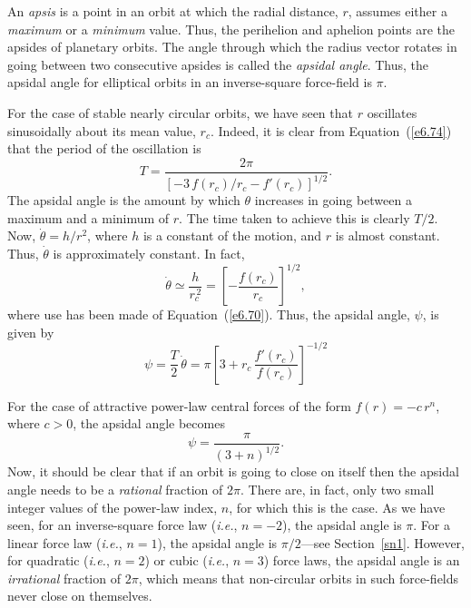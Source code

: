 An {\em apsis}\/ is a point in an orbit at which the radial distance, $r$, assumes either a
{\em maximum}\/  or a {\em minimum}\/ value. Thus, the perihelion and aphelion points
are the apsides of planetary orbits. The angle through which the radius vector
rotates in going between two consecutive apsides is called the {\em apsidal
angle}. Thus, the apsidal angle for elliptical orbits in an inverse-square
force-field is $\pi$. 

For the case of stable nearly circular orbits, we have seen that $r$ oscillates sinusoidally 
about its mean value, $r_c$. Indeed, it is clear from Equation~(\ref{e6.74}) that
the period of the oscillation is
\begin{equation}
T = \frac{2\pi}{\left[-3\,f(r_c)/r_c - f'(r_c)\right]^{1/2}}.
\end{equation}
The apsidal angle is the amount by which $\theta$ increases in going
between a maximum and a minimum of $r$. The time taken
to achieve this is clearly $T/2$.  Now, $\dot{\theta} = h/r^2$, where $h$
is a constant of the motion, and $r$ is almost constant. Thus, $\dot{\theta}$
is approximately constant. In fact,
\begin{equation}
\dot{\theta} \simeq \frac{h}{r_c^{\,2}} = \left[-\frac{f(r_c)}{r_c}\right]^{1/2},
\end{equation}
where use has been made of Equation~(\ref{e6.70}). Thus, the apsidal angle,
$\psi$, 
is given by
\begin{equation}\label{e6.81}
\psi = \frac{T}{2}\, \dot{\theta} = \pi \left[3+r_c\,\frac{f'(r_c)}{f(r_c)}\right]^{-1/2}
\end{equation}

For the case of attractive power-law central forces of the form $f(r) = -c\,r^n$, where
$c>0$, the apsidal angle becomes
\begin{equation}
\psi = \frac{\pi}{(3+n)^{1/2}}.
\end{equation}
Now, it should be clear that if an orbit is going to close on itself then the apsidal angle needs to be a {\em rational}\/ fraction of $2\pi$. There are, in fact,
only two small integer values of the power-law index, $n$, for which this
is the case. As we have seen, for an inverse-square force law ({\em i.e.}, $n=-2$), the
apsidal angle is $\pi$. For a linear force law ({\em i.e.}, $n=1$),
the apsidal angle is $\pi/2$---see Section~\ref{sn1}. However, for quadratic ({\em i.e.}, $n=2$) or cubic ({\em i.e.}, $n=3$) force laws, the apsidal angle is an {\em irrational}\/
fraction of $2\pi$, which means that non-circular orbits in such force-fields
never close on themselves.

